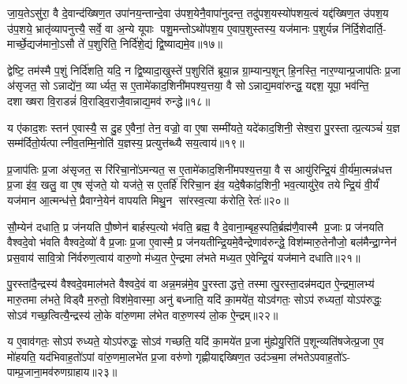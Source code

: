 जा॒य॒तेऽसु॑रा॒ वै दे॒वान्द॑ख्षिण॒त उपा॑नय॒न्तान्दे॒वा उ॑पश॒येनै॒वापा॑नुदन्त॒ तदु॑पश॒यस्यो॑पशय॒त्वं यद्द॑ख्षिण॒त उ॑पश॒य उ॑प॒शये॒ भ्रातृ॑व्यापनुत्त्यै॒ सर्वे॒ वा अ॒न्ये यूपाः पशु॒मन्तोऽथो॑पश॒य ए॒वाप॒शुस्तस्य॒ यज॑मानः प॒शुर्यन्न नि॑र्दि॒शेदार्ति॒- मार्च्छे॒द्यज॑मानो॒ऽसौ ते॑ प॒शुरिति॒ निर्दि॑शे॒द्यं द्वि॒ष्याद्यमे॒व॥१७॥

द्वेष्टि॒ तम॑स्मै प॒शुं निर्दि॑शति॒ यदि॒ न द्वि॒ष्यादा॒खुस्ते॑ प॒शुरिति॑ ब्रूया॒न्न ग्रा॒म्यान्प॒शून् हि॒नस्ति॒ नार॒ण्यान्प्र॒जाप॑तिः प्र॒जा अ॑सृजत॒ सोऽन्नाद्ये॑न॒ व्यार्ध्यत॒ स ए॒तामे॑काद॒शिनी॑मपश्य॒त्तया॒ वै सोऽन्नाद्य॒मवा॑रुन्द्ध॒ यद्दश॒ यूपा॒ भव॑न्ति॒ दशाख्षरा वि॒राडन्नं॑ वि॒राड्वि॒राजै॒वान्नाद्य॒मव॑ रुन्द्धे॥१८॥

य ए॑काद॒शः स्तन॑ ए॒वास्यै॒ स दु॒ह ए॒वैनां॒ तेन॒ वज्रो॒ वा ए॒षा सम्मी॑यते॒ यदे॑काद॒शिनी॒ सेश्व॒रा पु॒रस्तात्प्र॒त्यञ्चं॑ य॒ज्ञ सम्म॑र्दितो॒र्यत्पात्नीव॒तम्मि॒नोति॑ य॒ज्ञस्य॒ प्रत्युत्त॑ब्ध्यै सय॒त्वाय॑॥१९॥

{\anuvakamend[{वै सम॑ष्ट्यै॒ पुमा॑ने॒वास्य॒ यमे॒व रु॑न्धे त्रि॒ꣳ॒शच्च॑॥४॥}]}

प्र॒जाप॑तिः प्र॒जा अ॑सृजत॒ स रि॑रिचा॒नो॑ऽमन्यत॒ स ए॒तामे॑काद॒शिनी॑मपश्य॒त्तया॒ वै स आयु॑रिन्द्रि॒यं वी॒र्य॑मा॒त्मन्न॑धत्त प्र॒जा इ॑व॒ खलु॒ वा ए॒ष सृ॑जते॒ यो यज॑ते॒ स ए॒तर्\mbox{}हि॑ रिरिचा॒न इ॑व॒ यदे॒षैका॑द॒शिनी॒ भव॒त्यायु॑रे॒व तयेन्द्रि॒यं वी॒र्यं॑ यज॑मान आ॒त्मन्ध॑त्ते॒ प्रैवाग्ने॒येन॑ वापयति मिथु॒न सा॑रस्व॒त्या क॑रोति॒ रेतः॑॥२०॥

सौ॒म्येन॑ दधाति॒ प्र ज॑नयति पौ॒ष्णेन॑ बार्\mbox{}हस्प॒त्यो भ॑वति॒ ब्रह्म॒ वै दे॒वाना॒म्बृह॒स्पति॒र्ब्रह्म॑णै॒वास्मै प्र॒जाः प्र ज॑नयति वैश्वदे॒वो भ॑वति वैश्वदे॒व्यो॑ वै प्र॒जाः प्र॒जा ए॒वास्मै॒ प्र ज॑नयतीन्द्रि॒यमे॒वैन्द्रेणाव॑रुन्द्धे॒ विश॑म्मारु॒तेनौजो॒ बल॑मैन्द्रा॒ग्नेन॑ प्रस॒वाय॑ सावि॒त्रो नि॑र्वरुण॒त्वाय॑ वारु॒णो म॑ध्य॒त ऐ॒न्द्रमा ल॑भते मध्य॒त ए॒वेन्द्रि॒यं यज॑माने दधाति॥२१॥

पु॒रस्ता॑दै॒न्द्रस्य॑ वैश्वदे॒वमाल॑भते वैश्वदे॒वं वा अन्न॒मन्न॑मे॒व पु॒रस्ताद्धत्ते॒ तस्मात्पु॒रस्ता॒दन्न॑मद्यत ऐ॒न्द्रमा॒लभ्य॑ मारु॒तमा ल॑भते॒ विड्वै म॒रुतो॒ विश॑मे॒वास्मा॒ अनु॑ बध्नाति॒ यदि॑ का॒मये॑त॒ योऽव॑गतः॒ सोऽप॑ रुध्यतां॒ योऽप॑रुद्धः॒ सोऽव॑ गच्छ॒त्वित्यै॒न्द्रस्य॑ लो॒के वा॑रु॒णमा ल॑भेत वारु॒णस्य॑ लो॒क ऐ॒न्द्रम्॥२२॥

य ए॒वाव॑गतः॒ सोऽप॑ रुध्यते॒ योऽप॑रुद्धः॒ सोऽव॑ गच्छति॒ यदि॑ का॒मये॑त प्र॒जा मु॑ह्येयु॒रिति॑ प॒शून्व्यति॑षजेत्प्र॒जा ए॒व मो॑हयति॒ यद॑भिवाह॒तो॑ऽपां वा॑रु॒णमा॒लभे॑त प्र॒जा वरु॑णो गृह्णीयाद्दख्षिण॒त उद॑ञ्च॒मा ल॑भतेऽपवाह॒तो॑ऽ- पाम्प्र॒जाना॒मव॑रुणग्राहाय॥२३॥


